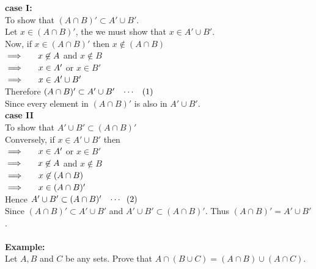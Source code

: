 \documentclass[11pt,a4paper]{article}
\begin{document}
\textbf{case I:}\\
To show that $(A\cap B)'\subset A'\cup B'$.\\
Let $x\in (A\cap B)'$, the we must show that $x\in A'\cup B'$.\\
Now, if $x\in (A\cap B)'$ then $x\not\in (A\cap B)$\\
$\implies \hspace{0.5cm} x\not\in A$ and $x\not\in B$\\
$\implies \hspace{0.5cm} x\in A'$ or $x\in B'$\\
$\implies \hspace{0.5cm} x\in A'\cup B'$\\
Therefore $(A\cap B)'\subset A'\cup B'\hspace{0.3cm} \cdots\hspace{0.3cm} (1)$\\
Since every element in $(A\cap B)'$ is also in $A'\cup B'$.\\

\textbf{case II}\\
To show that $A'\cup B' \subset (A\cap B)'$\\
Conversely, if $x\in A'\cup B'$ then\\
$\implies \hspace{0.5cm} x\in A'$ or $x\in B'$\\
$\implies \hspace{0.5cm} x\not\in A$ and $x\not\in B$\\
$\implies \hspace{0.5cm} x\not\in (A\cap B)$\\
$\implies \hspace{0.5cm} x\in (A\cap B)'$\\
Hence $A'\cup B'\subset (A\cap B)'\hspace{0.3cm} \cdots \hspace{0.2cm} (2)$\\

Since $(A\cap B)'\subset A'\cup B'$ and $A'\cup B'\subset (A\cap B)'$. Thus $(A\cap B)' =A' \cup B'$.\\\\



\textbf{Example:}\\
Let $A, B$ and $C$ be any sets. Prove that $A\cap (B\cup C)=(A\cap B)\cup (A\cap C)$.\\\\
\end{document}
